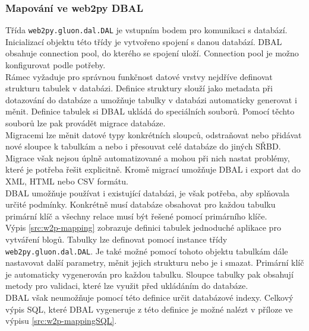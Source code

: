 \documentclass[ing,male,java,dept456]{diploma}						%
\begin{document}
\subsubsection{Mapování ve web2py DBAL}
Třída \lstinline[style=inlinepython]|web2py.gluon.dal.DAL| je vstupním bodem pro komunikaci s databází. Inicializací objektu této třídy je vytvořeno spojení s danou databází. DBAL obsahuje connection pool, do kterého se spojení uloží. Connection pool je možno konfigurovat podle potřeby. \\
Rámec vyžaduje pro správnou funkčnost datové vrstvy nejdříve definovat strukturu tabulek v databázi. Definice struktury slouží jako metadata při dotazování do databáze a umožňuje tabulky v databázi automaticky generovat i měnit. Definice tabulek si DBAL ukládá do speciálních souborů. Pomocí těchto souborů lze pak provádět migrace databáze. \\
Migracemi lze měnit datové typy konkrétních sloupců, odstraňovat nebo přidávat nové sloupce k tabulkám a nebo i přesouvat celé databáze do jiných SŘBD. Migrace však nejsou úplně automatizované a mohou při nich nastat problémy, které je potřeba řešit explicitně. Kromě migrací umožňuje DBAL i export dat do XML, HTML nebo CSV formátu. \\
DBAL umožňuje používat i existující databázi, je však potřeba, aby splňovala určité podmínky. Konkrétně musí databáze obsahovat pro každou tabulku primární klíč a všechny relace musí být řešené pomocí primárního klíče. \\
Výpis \ref{src:w2p-mapping} zobrazuje definici tabulek jednoduché aplikace pro vytváření blogů. Tabulky lze definovat pomocí instance třídy \lstinline[style=inlinepython]|web2py.gluon.dal.DAL|. Je také možné pomocí tohoto objektu tabulkám dále nastavovat další parametry, měnit jejich strukturu nebo je i smazat. Primární klíč je automaticky vygenerován pro každou tabulku. Sloupce tabulky pak obsahují metody pro validaci, které lze využit před ukládáním do databáze. \\
DBAL však neumožňuje pomocí této definice určit databázové indexy. Celkový výpis SQL, které DBAL vygeneruje z této definice je možné nalézt v příloze ve výpisu \ref{src:w2p-mappingSQL}.
\end{document}
